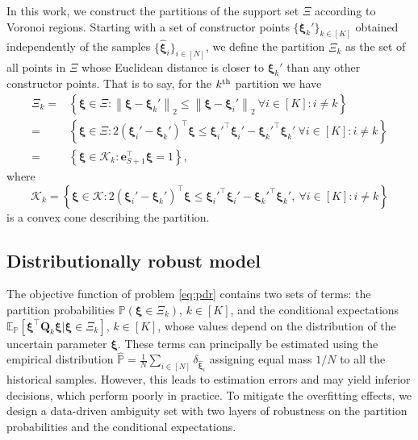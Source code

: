\documentclass{article}
\newcommand{\PP}{\mathbb{P}}
\newcommand{\EE}{\mathbb{E}}
\begin{document}
 
In this work, we construct the partitions of the support set $\Xi$ according to Voronoi regions. Starting with a set of constructor points $\{\bm \xi_k'\}_{k \in [K]}$ obtained independently of the samples $\{ \hat{\bm\xi}_i\}_{i \in [N]}$, we define the partition $\Xi_k$ as the set of all points in $\Xi$ whose Euclidean distance is closer to $\bm \xi_k'$ than any other constructor points. That is to say, for the $k^{\textup{th}}$ partition we have
\begin{equation*}
\begin{array}{rl}
\Xi_k =& \left \{ \bm \xi \in \Xi:\left \| \bm \xi - \bm \xi_k' \right \|_2 \leq \left \| \bm \xi - \bm \xi_i' \right \|_2 \ \forall i \in [K]:i \neq  k \right \} \\
=& \left \{ \bm \xi \in \Xi: 2(\bm \xi_i' - \bm \xi_k')^\top \bm  \xi \leq \bm  \xi_i'^\top\bm \xi_i'  - \bm \xi_k'^\top \bm  \xi_k' \ \forall i \in [K]:i \neq  k \right \} \\
=& \left \{ \bm \xi \in \mathcal{K}_k:
    \mathbf{e}_{S+1}^\top \bm \xi = 1
    \right \},
\end{array}
\end{equation*}
where %
\begin{equation}
\label{eq:Voronoi_partitions_cones}
 \mathcal{K}_k = \left \{ \bm \xi \in \mathcal{K} : 2(\bm \xi_i' - \bm \xi_k')^\top \bm  \xi \leq \bm  \xi_i'^\top\bm \xi_i' - \bm \xi_k'^\top \bm  \xi_k', \ \forall i \in [K]:i \neq  k \right \}
\end{equation}
is a convex cone describing the partition.

\subsection{Distributionally robust model}

The objective function of problem \eqref{eq:pdr} contains two sets of terms: the partition probabilities $\PP(\bm \xi \in \Xi_k)$, $k \in [K]$, and the conditional expectations $\EE_\PP[\bm \xi^\top \bm Q_k \bm\xi | \bm \xi \in \Xi_k]$, $k \in [K]$, whose values depend on the distribution of the uncertain parameter $\bm \xi$. These terms can principally be %
estimated using the empirical distribution $\hat{\PP} = \frac{1}{N} \sum_{i \in [N]} \delta_{\hat{\bm\xi}_i}$ assigning equal mass $1/N$ to all the historical samples. However, this leads to estimation errors and may yield inferior decisions, which perform poorly in practice. To mitigate the overfitting effects,  we design a data-driven ambiguity set with two layers of robustness on the partition probabilities and the conditional expectations. %
\end{document}
